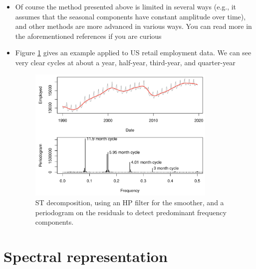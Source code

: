 \documentclass{article}
\begin{document}
\begin{itemize}
\item Of course the method presented above is limited in several ways (e.g., it
  assumes that the seasonal components have constant amplitude over time), and
  other methods are more advanced in various ways. You can read more in the 
  aforementioned references if you are curious

\item Figure \ref{fig:st_decomposition} gives an example applied to US retail 
  employment data. We can see very clear cycles at about a year, half-year,
  third-year, and quarter-year 

\begin{figure}[htb]
\centering
\includegraphics[width=0.85\textwidth]{fig/st-decomposition-1.pdf}
\caption{ST decomposition, using an HP filter for the smoother, and a
  periodogram on the residuals to detect predominant frequency components.}  
\label{fig:st_decomposition}
\end{figure}
\end{itemize}

\section{Spectral representation}
\end{document}
